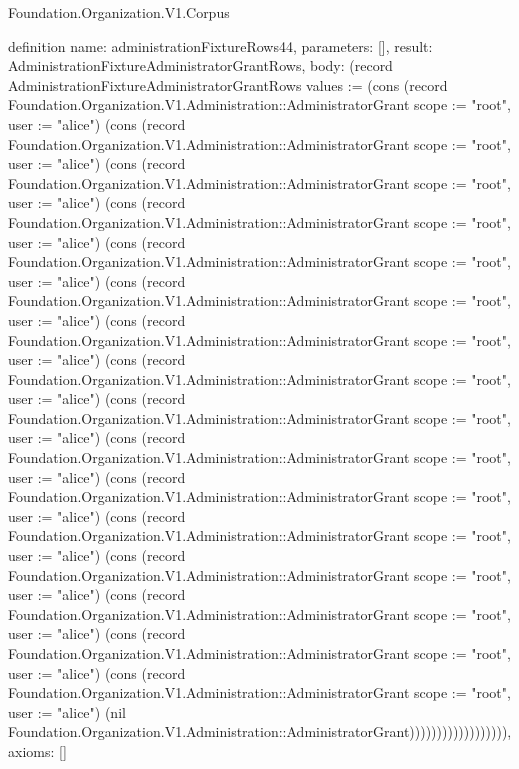 \begin{lexlean}{Foundation.Organization.V1.Corpus}
\begin{semanticmodule}
definition{
  name: administrationFixtureRows44,
  parameters: [],
  result: AdministrationFixtureAdministratorGrantRows,
  body: (record AdministrationFixtureAdministratorGrantRows {values := (cons (record Foundation.Organization.V1.Administration::AdministratorGrant {scope := "root", user := "alice"}) (cons (record Foundation.Organization.V1.Administration::AdministratorGrant {scope := "root", user := "alice"}) (cons (record Foundation.Organization.V1.Administration::AdministratorGrant {scope := "root", user := "alice"}) (cons (record Foundation.Organization.V1.Administration::AdministratorGrant {scope := "root", user := "alice"}) (cons (record Foundation.Organization.V1.Administration::AdministratorGrant {scope := "root", user := "alice"}) (cons (record Foundation.Organization.V1.Administration::AdministratorGrant {scope := "root", user := "alice"}) (cons (record Foundation.Organization.V1.Administration::AdministratorGrant {scope := "root", user := "alice"}) (cons (record Foundation.Organization.V1.Administration::AdministratorGrant {scope := "root", user := "alice"}) (cons (record Foundation.Organization.V1.Administration::AdministratorGrant {scope := "root", user := "alice"}) (cons (record Foundation.Organization.V1.Administration::AdministratorGrant {scope := "root", user := "alice"}) (cons (record Foundation.Organization.V1.Administration::AdministratorGrant {scope := "root", user := "alice"}) (cons (record Foundation.Organization.V1.Administration::AdministratorGrant {scope := "root", user := "alice"}) (cons (record Foundation.Organization.V1.Administration::AdministratorGrant {scope := "root", user := "alice"}) (cons (record Foundation.Organization.V1.Administration::AdministratorGrant {scope := "root", user := "alice"}) (cons (record Foundation.Organization.V1.Administration::AdministratorGrant {scope := "root", user := "alice"}) (cons (record Foundation.Organization.V1.Administration::AdministratorGrant {scope := "root", user := "alice"}) (nil Foundation.Organization.V1.Administration::AdministratorGrant)))))))))))))))))}),
  axioms: []
}


\end{semanticmodule}
\end{lexlean}
